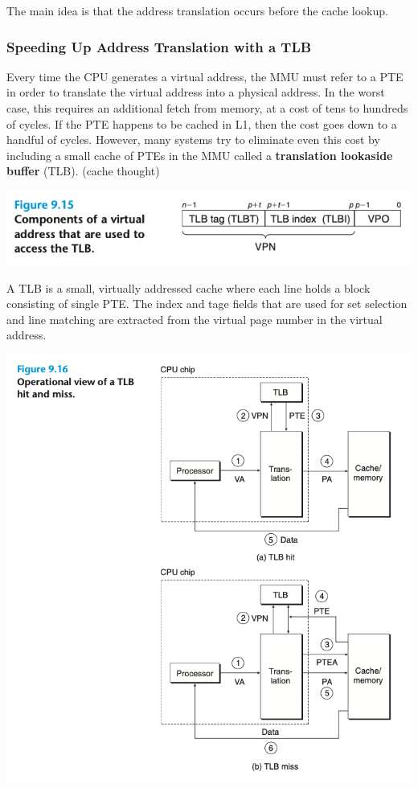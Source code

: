 \documentclass[11pt]{article}
\begin{document}
The main idea is that the address translation occurs before the cache lookup.\\

\subsubsection{Speeding Up Address Translation with a TLB}
\label{sec:org8ecd01d}
Every time the CPU generates a virtual address, the MMU must refer to a PTE in order to translate the virtual address into a physical address.  In the worst case, this requires an additional fetch from memory, at a cost of tens to hundreds of cycles. If the PTE happens to be cached in L1, then the cost goes down to a handful of cycles. However, many systems try to eliminate even this cost by including a small cache of PTEs in the MMU called a \textbf{translation lookaside buffer} (TLB). (cache thought)\\

\begin{center}
\includegraphics[width=.9\linewidth]{pics/figure9.15-tlb.png}
\end{center}

A TLB is a small, virtually addressed cache where each line holds a block consisting of single PTE. The index and tage fields that are used for set selection and line matching are extracted from the virtual page number in the virtual address.\\

\begin{center}
\includegraphics[width=.9\linewidth]{pics/figure9.16-tlb-hit-and-miss.png}
\end{center}
\end{document}
